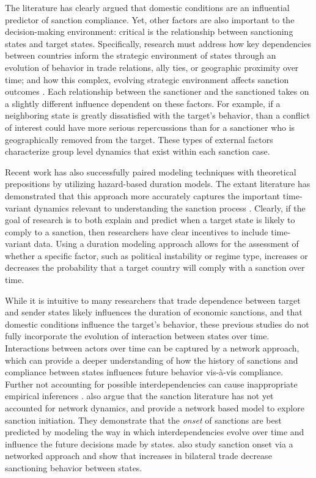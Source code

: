 
The literature has clearly argued that domestic conditions are an influential predictor of sanction compliance. Yet, other factors are also important to the decision-making environment: critical is the relationship between sanctioning states and target states. Specifically, research must address how key dependencies between countries inform the strategic environment of states through an evolution of behavior in trade relations, ally ties, or geographic proximity over time; and how this complex, evolving strategic environment affects sanction outcomes \citep{mclean2010friends}. Each relationship between the sanctioner and the sanctioned takes on a slightly different influence dependent on these factors. For example, if a neighboring state is greatly dissatisfied with the target's behavior, than a conflict of interest could have more serious repercussions than for a sanctioner who is geographically removed from the target. These types of external factors characterize group level dynamics that exist within each sanction case. 

Recent work has also successfully paired modeling techniques with theoretical prepositions by utilizing hazard-based duration models. The extant literature has demonstrated that this approach more accurately captures the important time-variant dynamics relevant to understanding the sanction process \citep{bolks2000}. Clearly, if the goal of research is to both explain and predict when a target state is likely to comply to a sanction, then researchers have clear incentives to include time-variant data. Using a duration modeling approach allows for the assessment of whether a specific factor, such as political instability or regime type, increases or decreases the probability that a target country will comply with a sanction over time.

While it is intuitive to many researchers that trade dependence between target and sender states likely influences the duration of economic sanctions, and that domestic conditions influence the target's behavior, these previous studies do not fully incorporate the evolution of interaction between states over time. Interactions between actors over time can be captured by a network approach, which can provide a deeper understanding of how the history of sanctions and compliance between states influences future behavior vis-\`a-vis compliance. Further not accounting for possible interdependencies can cause inappropriate empirical inferences \citep{erikson2014dyadic}. \citet{cranmer2014reciprocity} also argue that the sanction literature has not yet accounted for network dynamics, and provide a network based model to explore sanction initiation. They demonstrate that the \textit{onset} of sanctions are best predicted by modeling the way in which interdependencies evolve over time and influence the future decisions made by states. \citet{hafner2008} also study sanction onset via a networked approach and show that increases in bilateral trade decrease sanctioning behavior between states.

